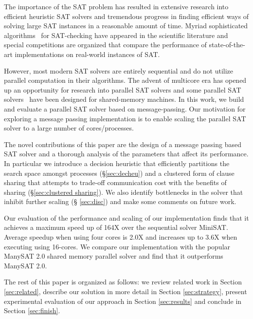 \documentclass[letterpaper, compsoc, conference]{IEEEtran}
\begin{document}
The importance of the SAT problem has resulted in extensive research into
efficient heuristic SAT solvers and tremendous progress in finding efficient
ways of solving large SAT instances in a reasonable amount of time.  Myriad
sophisticated algorithms~\cite{Davis1962, Selman1992, Zhang94sato,
Selman95localsearch, PSATO, Bohm96, Silva1997GRASP, Moskewicz2001Chaff,
Forman02NagSat, MiniSat, Blochinger2003, Chrabakh03gradsat, Jurkowiak2005,
Lewis2007MiraXT, PMiniSat, Gil08Pmsat, ManySAT} for SAT-checking have appeared
in the scientific literature and special competitions \cite{SATRace2008} are
organized that compare the performance of state-of-the-art implementations on
real-world instances of SAT. 

However, most modern SAT solvers are entirely sequential and do not utilize
parallel computation in their algorithms. The advent of multicore era has
opened up an opportunity for research into parallel SAT solvers and some
parallel SAT solvers~\cite{ManySAT} have been designed for shared-memory
machines.  In this work, we build and evaluate a parallel SAT solver based on
message-passing. Our motivation for exploring a message passing implementation
is to enable scaling the parallel SAT solver to a large number of
cores/processes.

The novel contributions of this paper are the design of a message passing based
SAT solver and a thorough analysis of the parameters that affect its
performance. In particular we introduce a decision heuristic that efficiently
partitions the search space amongst processes (\S\ref{sec:decheu}) and 
a clustered form of clause sharing that attempts to trade-off communication
cost with the benefits of sharing (\S\ref{sec:clustered sharing}). We also
identify bottlenecks in the solver that inhibit further scaling (\S
\ref{sec:disc}) and make some comments on future work.  

Our evaluation of the performance and scaling of our implementation finds that
it achieves a maximum speed up of 164X over the sequential solver MiniSAT.
Average speedup when using four cores is 2.0X and increases up to 3.6X when
executing using 16-cores. We compare our implementation with the popular
ManySAT 2.0 shared memory parallel solver and find that it outperforms ManySAT
2.0. 

The rest of this paper is organized as follows: we review related work in
Section \ref{sec:related}, describe our solution in more detail in Section
\ref{sec:strategy}, present experimental evaluation of our approach in Section
\ref{sec:results} and conclude in Section \ref{sec:finish}.
\end{document}
